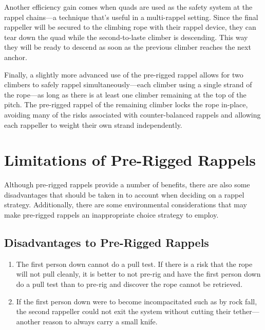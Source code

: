 \documentclass[nonacm,acmtog]{acmart}
\begin{document}
  Another efficiency gain comes when quads are used as the safety system at the
  rappel chains---a technique that's useful in a multi-rappel setting.  Since
  the final rappeller will be secured to the climbing rope with their rappel
  device, they can tear down the quad while the second-to-laste climber is
  descending.  This way they will be ready to descend as soon as the previous
  climber reaches the next anchor.


  Finally, a slightly more advanced use of the pre-rigged rappel allows for two
  climbers to safely rappel simultaneously---each climber using a single strand
  of the rope---as long as there is at least one climber remaining at the top
  of the pitch.  The pre-rigged rappel of the remaining climber locks the rope
  in-place, avoiding many of the risks associated with counter-balanced rappels
  and allowing each rappeller to weight their own strand independently.

\section{Limitations of Pre-Rigged Rappels}
\label{sec:limitations}

  Although pre-rigged rappels provide a number of benefits, there are also some
  disadvantages that should be taken in to account when deciding on a rappel
  strategy.  Additionally, there are some environmental considerations that may
  make pre-rigged rappels an inappropriate choice strategy to employ.

\subsection{Disadvantages to Pre-Rigged Rappels}
  \begin{enumerate}
  \item The first person down cannot do a pull test.  If there is a risk that
    the rope will not pull cleanly, it is better to not pre-rig and have the
    first person down do a pull test than to pre-rig and discover the rope
    cannot be retrieved.
  \item If the first person down were to become incompacitated such as by rock
    fall, the second rappeller could not exit the system without cutting their
    tether---another reason to always carry a small knife.
  \end{enumerate}
\end{document}
